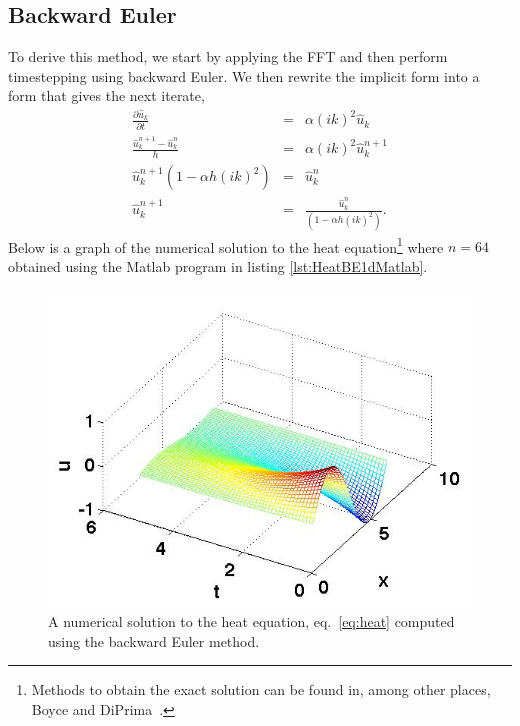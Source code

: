 \subsection{Backward Euler}
To derive this method, we start by applying the FFT and then perform timestepping using backward Euler. We then rewrite the implicit form into a form that gives the next iterate,
\begin{eqnarray}
\frac{\partial \hat{u}_k}{\partial t} &=& \alpha (ik)^2 \hat{u}_k \\
\frac{\hat{u}_k^{n+1}-\hat{u}_k^n}{h} &=& \alpha (ik)^2 \hat{u}_k^{n+1} \\
\hat{u}_k^{n+1}(1-\alpha h(ik)^2) &=&\hat{u}_k^n\\
\hat{u}_k^{n+1} &=&\frac{\hat{u}_k^n}{(1-\alpha h(ik)^2)}.
\end{eqnarray}
Below is a graph of the numerical solution to the heat equation\footnote{Methods to obtain the exact solution can be found in, among other places,  Boyce and DiPrima~\cite{BoyDip10}. } where $n=64$ obtained using the Matlab program in listing \ref{lst:HeatBE1dMatlab}. 
\begin{figure}
 \begin{center}
\includegraphics[scale=.35]{./ExamplesInMatlab/Heat_Equation_1D_BE_Color}
\caption{A numerical solution to the heat equation, eq.\ \eqref{eq:heat} computed using the backward Euler method.} \label{fig:HeatBE1dMatlab}
\end{center}
\end{figure}



